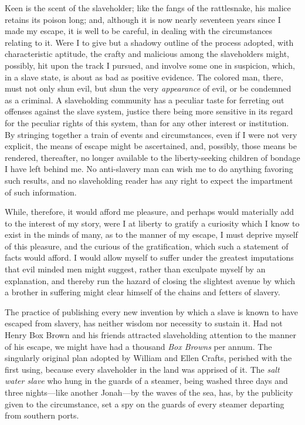 Keen is the scent of the slaveholder; like the fangs of the rattlesnake,
his malice retains its poison long; and, although it is now nearly
seventeen years since I made my escape, it is well to be careful, in
dealing with the circumstances relating to it. Were I to give but a
shadowy outline of the process adopted, with characteristic aptitude,
the crafty and malicious among the slaveholders might, possibly, hit
upon the track I pursued, and involve some one in suspicion, which, in a
slave state, is about as bad as positive evidence. The colored man,
there, must not only shun evil, but shun the very \emph{appearance} of
evil, or be condemned as a criminal. A slaveholding community has a
peculiar taste for ferreting out offenses against the slave system,
justice there being more sensitive in its regard for the peculiar rights
of this system, than for any other interest or institution. By stringing
together a train of events and circumstances, even if I were not very
explicit, the means of escape might be ascertained, and, possibly, those
means be rendered, thereafter, no longer available to the
liberty-seeking children of bondage I have left behind me. No
anti-slavery man can wish me to do anything favoring such results, and
no slaveholding reader has any right to expect the impartment of such
information.

While, therefore, it would afford me pleasure, and perhaps would
materially add to the interest of my
{\protect\hypertarget{323}{}{}}story, were I at liberty to gratify a
curiosity which I know to exist in the minds of many, as to the manner
of my escape, I must deprive myself of this pleasure, and the curious of
the gratification, which such a statement of facts would afford. I would
allow myself to suffer under the greatest imputations that evil minded
men might suggest, rather than exculpate myself by an explanation, and
thereby run the hazard of closing the slightest avenue by which a
brother in suffering might clear himself of the chains and fetters of
slavery.

The practice of publishing every new invention by which a slave is known
to have escaped from slavery, has neither wisdom nor necessity to
sustain it. Had not Henry Box Brown and his friends attracted
slaveholding attention to the manner of his escape, we might have had a
thousand \emph{Box Browns} per annum. The singularly original plan
adopted by William and Ellen Crafts, perished with the first using,
because every slaveholder in the land was apprised of it. The \emph{salt
water slave} who hung in the guards of a steamer, being washed three
days and three nights---like another Jonah---by the waves of the sea,
has, by the publicity given to the circumstance, set a spy on the guards
of every steamer departing from southern ports.


